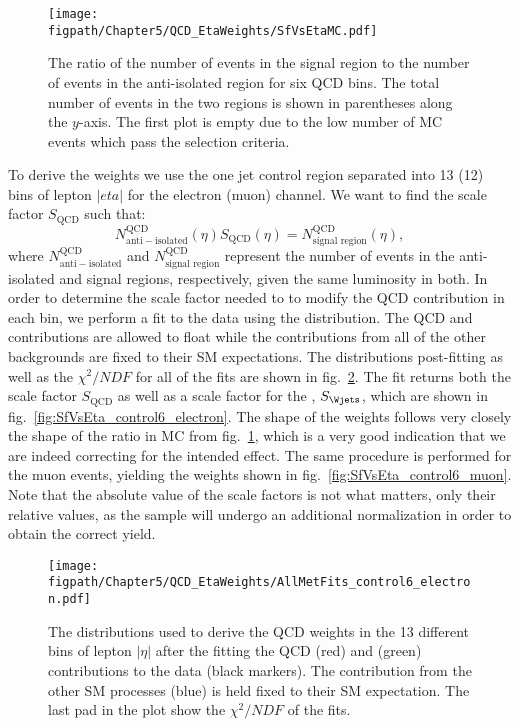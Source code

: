 \begin{figure}[!hbt]
    \centering
    \texttt{[image: \\figpath/Chapter5/QCD\_EtaWeights/SfVsEtaMC.pdf]}
    \caption{The ratio of the number of events in the signal region to the number of events in the anti-isolated region for six QCD \pthat bins. The total number of events in the two regions is shown in parentheses along the $y$-axis. The first plot is empty due to the low number of MC events which pass the selection criteria.}
    \label{fig:SfVsEtaMC}
\end{figure}

To derive the weights we use the one jet control region separated into 13 (12) bins of lepton $|eta|$ for the electron (muon) channel.
We want to find the scale factor $S_{\mathrm{QCD}}$ such that:
\begin{equation}
  N_{\mathrm{anti-isolated}}^{\mathrm{QCD}}\left(\eta\right)S_{\mathrm{QCD}}\left(\eta\right)=N_{\text{signal region}}^{\mathrm{QCD}}\left(\eta\right),
\end{equation}
where $N_{\mathrm{anti-isolated}}^{\mathrm{QCD}}$ and $N_{\text{signal region}}^{\mathrm{QCD}}$ represent the number of events in the anti-isolated and signal regions, respectively, given the same luminosity in both.
In order to determine the scale factor needed to to modify the QCD contribution in each bin, we perform a fit to the data using the \ETslash distribution.
The QCD and \Wjets contributions are allowed to float while the contributions from all of the other backgrounds are fixed to their SM expectations.
The \ETslash distributions post-fitting as well as the $\chi^{2}/NDF$ for all of the fits are shown in fig.~\ref{fig:AllMetFits_control6_electron}.
The fit returns both the scale factor $S_{\mathrm{QCD}}$ as well as a scale factor for the \Wjets, $S_{\Wjets}$, which are shown in fig.~\ref{fig:SfVsEta_control6_electron}.
The shape of the weights follows very closely the shape of the ratio in MC from fig.~\ref{fig:SfVsEtaMC}, which is a very good indication that we are indeed correcting for the intended effect.
The same procedure is performed for the muon events, yielding the weights shown in fig.~\ref{fig:SfVsEta_control6_muon}.
Note that the absolute value of the scale factors is not what matters, only their relative values, as the sample will undergo an additional normalization in order to obtain the correct yield.

\begin{figure}[!hbt]
    \centering
    \texttt{[image: \\figpath/Chapter5/QCD\_EtaWeights/AllMetFits\_control6\_electron.pdf]}
    \caption{The \ETslash distributions used to derive the QCD weights in the 13 different bins of lepton $|\eta|$ after the fitting the QCD (red) and \Wjets (green) contributions to the data (black markers). The contribution from the other SM processes (blue) is held fixed to their SM expectation. The last pad in the plot show the $\chi^{2}/NDF$ of the fits.}
    \label{fig:AllMetFits_control6_electron}
\end{figure}

